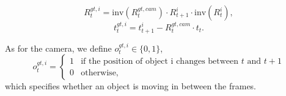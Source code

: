 \begin{equation}
R_{t}^{gt, i} = \mathrm{inv}(R_t^{gt, cam}) \cdot R_{t+1}^i \cdot \mathrm{inv}(R_t^i),
\end{equation}
\begin{equation}
t_{t}^{gt, i} = t_{t+1}^{i}  - R_t^{gt, cam} \cdot t_t.
\end{equation}

As for the camera, we define $o_t^{gt, i} \in \{ 0, 1 \}$,
\begin{equation}
o_t^{gt, i} =
\begin{cases}
1 &\text{if the position of object i changes between $t$ and $t+1$} \\
0 &\text{otherwise,}
\end{cases}
\end{equation}
which specifies whether an object is moving in between the frames.

